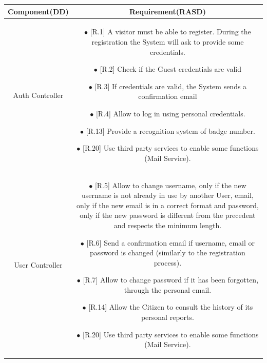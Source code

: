 \documentclass{report}
\begin{document}
\begin{tabularx}{\linewidth}{| c || c |}
    \hline
    \endfoot

    \hline
\textbf{Component(DD)} & \textbf{Requirement(RASD)}\\
	\hline
	\hline
    \large{Auth Controller} & \parbox{0.45\textwidth}{ \vspace{2mm}
    $\bullet$ {[R.1]} A visitor must be able to register. During the registration the System will ask to provide some credentials. \\

	$\bullet$ {[R.2]} Check if the Guest credentials are valid \\

	$\bullet$ {[R.3]} If credentials are valid, the System sends a confirmation email \\

	$\bullet$ {[R.4]} Allow to log in using personal credentials. \\

    $\bullet$ {[R.13]} Provide a recognition system of badge number.\\
     
    $\bullet$ {[R.20]} Use third party services to enable some functions (Mail Service).\\}\\
        
    \hline
    \large{User Controller} & \parbox{0.45\textwidth}{ \vspace{2mm} 
    $\bullet$ {[R.5]} Allow to change username, only if the new username is not already in use by another User, email, only if the new email is in a correct format and password, only if the new password is different from the precedent and respects the minimum length. \\

	$\bullet$ {[R.6]} Send a confirmation email if username, email or password is changed (similarly to the registration process). \\

	$\bullet$ {[R.7]} Allow to change password if it has been forgotten, through the personal email. \\

    $\bullet$ {[R.14]} Allow the Citizen to consult the history of its personal reports.\\
    
    $\bullet$ {[R.20]} Use third party services to enable some functions (Mail Service).\\} \\


\end{tabularx}
\end{document}
